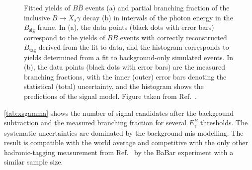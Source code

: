 \documentclass{moriond}
\def\BB{\ensuremath{B\overline{B}}\xspace}
\begin{document}
\begin{figure}[tb]
\centering
{}
\caption{
Fitted yields of \BB events (a) and partial branching fraction of the inclusive $B\rightarrow X_s \gamma$ decay (b) in intervals of the photon energy in the $B_{\mathrm{sig}}$ frame.
In (a), the data points (black dots with error bars) correspond to the yields of \BB events with correctly reconstructed $B_{\mathrm{tag}}$ derived from the fit to data, and the histogram corresponds to yields determined from a fit to background-only simulated events.
In (b), the data points (black dots with error bars) are the measured branching fractions, with the inner (outer) error bars denoting the statistical (total) uncertainty, and the histogram shows the predictions of the signal model. 
Figure taken from Ref.~{\protect\cite{Belle-II:2022hys}}.}
\label{fig:egamma}
\end{figure}

\cref{tab:xsgamma} shows the number of signal candidates after the background subtraction and the measured branching fraction for several $E_\gamma^B$ thresholds.
The systematic uncertainties are dominated by the background mis-modelling.
The result is compatible with the world average and competitive with the only other hadronic-tagging measurement from Ref.~\cite{BaBar:2007yhb} by the BaBar experiment with a similar sample size.
\end{document}
